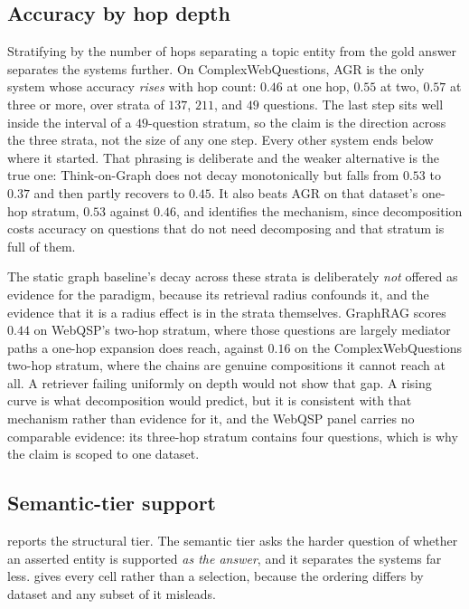 \subsection{Accuracy by hop depth}\label{sec:hops}

Stratifying by the number of hops separating a topic entity from the
gold answer separates the systems further. On ComplexWebQuestions, AGR
is the only system whose accuracy \emph{rises} with hop count: $0.46$ at
one hop, $0.55$ at two, $0.57$ at three or more, over strata of $137$,
$211$, and $49$ questions. The last step sits well inside the interval
of a $49$-question stratum, so the claim is the direction across the
three strata, not the size of any one step. Every other system ends
below where it started. That phrasing is deliberate and the weaker
alternative is the true one: Think-on-Graph does not decay monotonically
but falls from $0.53$ to $0.37$ and then partly recovers to $0.45$. It
also beats AGR on that dataset's one-hop stratum, $0.53$ against $0.46$,
and  identifies the mechanism, since decomposition
costs accuracy on questions that do not need decomposing and that
stratum is full of them.

The static graph baseline's decay across these strata is deliberately
\emph{not} offered as evidence for the paradigm, because its retrieval
radius confounds it, and the evidence that it is a radius effect is in
the strata themselves. GraphRAG scores $0.44$ on WebQSP's two-hop
stratum, where those questions are largely mediator paths a one-hop
expansion does reach, against $0.16$ on the ComplexWebQuestions two-hop
stratum, where the chains are genuine compositions it cannot reach at
all. A retriever failing uniformly on depth would not show that gap. A
rising curve is what decomposition would predict, but it is consistent
with that mechanism rather than evidence for it, and the WebQSP panel
carries no comparable evidence: its three-hop stratum contains four
questions, which is why the claim is scoped to one dataset.

\subsection{Semantic-tier support}\label{app:tier2}

 reports the structural tier. The semantic tier
asks the harder question of whether an asserted entity is supported
\emph{as the answer}, and it separates the systems far less.
 gives every cell rather than a selection, because the
ordering differs by dataset and any subset of it misleads.

